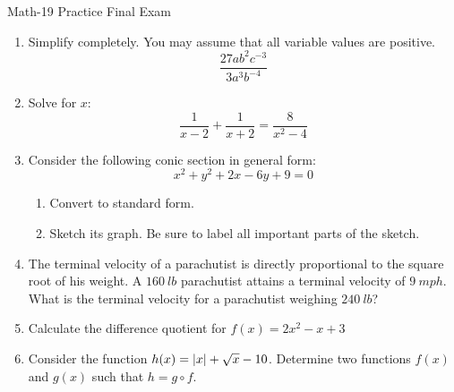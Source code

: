 \documentclass[letterpaper,12pt,fleqn]{article}
\begin{document}
\begin{center}
\Large Math-19 Practice Final Exam
\end{center}

\vspace{0.5in}

\begin{enumerate}

\item Simplify completely. You may assume that all variable values are
  positive.
  \[\frac{27ab^2c^{-3}}{3a^3b^{-4}}\]

  \vspace{3in}

\item Solve for $x$:
  \[\frac{1}{x-2}+\frac{1}{x+2}=\frac{8}{x^2-4}\]

  \newpage

\item Consider the following conic section in general form:
  \[x^2+y^2+2x-6y+9=0\]
  \begin{enumerate}
  \item Convert to standard form.

    \vspace{3in}

  \item Sketch its graph. Be sure to label all important parts of the sketch.

  \end{enumerate}

  \newpage

\item The terminal velocity of a parachutist is directly proportional to the
  square root of his weight. A $\SI{160}{lb}$ parachutist attains a terminal
  velocity of $\SI{9}{mph}$. What is the terminal velocity for a parachutist
  weighing $\SI{240}{lb}$?
  
  \vspace{3in}

\item Calculate the difference quotient for $f(x)=2x^2-x+3$

  \vspace{3in}

\item Consider the function $h(x)=\lvert x\rvert+\sqrt{x}-10$. Determine two
  functions $f(x)$ and $g(x)$ such that $h=g\circ f$.


\end{enumerate}
\end{document}
